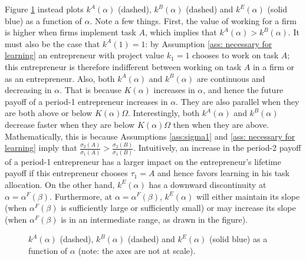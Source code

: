 \documentclass[12pt,american]{paper}
\theoremstyle{remark}
\begin{document}
Figure \ref{fig:thresholds} instead plots  $k^A (\alpha)$ (dashed), $k^B (\alpha)$ (dashed) and $k^E(\alpha)$ (solid blue) as a function of $\alpha$. Note a few things. First, the value of working for a firm is higher when firms implement task $A$, which implies that  $k^A (\alpha)>k^B (\alpha)$. It must also be the case that  $k^A (1)=1$: by Assumption  \ref{ass: necessary for learning} an entrepreneur with project value $k_1=1$ chooses to work on task $A$; this entrepreneur is therefore indifferent between working on task $A$ in a firm or as an entrepreneur. Also, both $k^A (\alpha)$ and $k^B (\alpha)$ are continuous and decreasing in $\alpha$.  That is because $K(\alpha)$ increases in $\alpha$, and hence the future payoff of a period-1 entrepreneur increases in $\alpha$. They are also parallel when they are both above or below $K(\alpha)\Omega$. Interestingly, both $k^A (\alpha)$ and $k^B (\alpha)$ decrease faster when they are below $K(\alpha)\Omega$ then when they are above. Mathematically, this is because Assumptions \ref{ass:sigma1} and \ref{ass: necessary for learning} imply that $\frac{\sigma_2(A)}{\sigma_1(A)}>\frac{\sigma_2(B)}{\sigma_1(B)}$. Intuitively, an increase in the period-2 payoff of a period-1 entrepreneur has a larger impact on the entrepreneur's lifetime payoff if this entrepreneur chooses $\tau_1=A$ and hence favors learning in his task allocation. On the other hand, $k^E(\alpha)$ has a downward discontinuity at $\alpha=\alpha^F(\beta)$. Furthermore,  at $\alpha=\alpha^F(\beta)$, $k^E(\alpha)$ will either maintain its slope (when $\alpha^F(\beta)$ is sufficiently large or sufficiently small) or may increase its slope (when $\alpha^F(\beta)$ is in an intermediate range, as drawn in the figure).

\begin{figure}[h]
\centering
{}
 \caption{$k^A (\alpha)$ (dashed), $k^B (\alpha)$ (dashed) and $k^E(\alpha)$ (solid blue) as a function of $\alpha$ (note: the axes are not at scale).}
    \label{fig:thresholds}

\end{figure}
\end{document}

